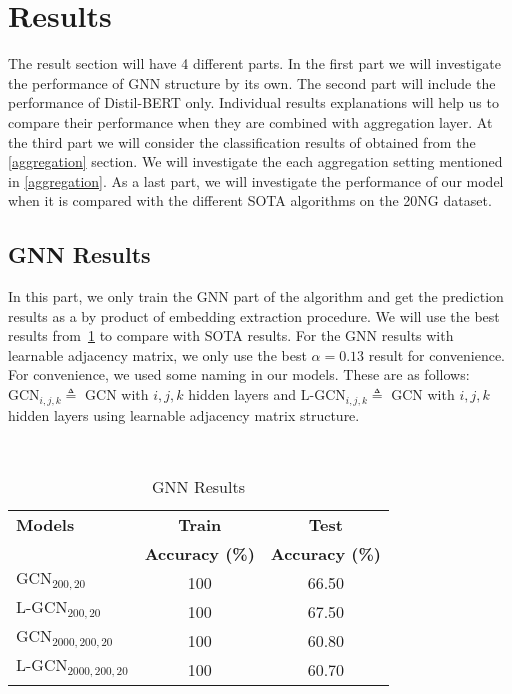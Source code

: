 \section{Results}\label{sec:results}
The result section will have 4 different parts. In the first part we will investigate the performance of GNN structure by its own. The second part will include the performance of Distil-BERT only. Individual results explanations will help us to compare their performance when they are combined with aggregation layer. At the third part we will consider the classification results of obtained \DOCEM{} from the \cref{aggregation} section. We will investigate the each aggregation setting mentioned in \cref{aggregation}. As a last part, we will investigate the performance of our model when it is compared with the different SOTA algorithms on the 20NG dataset.
\subsection{GNN Results}
In this part, we only train the GNN part of the algorithm and get the prediction results as a by product of embedding extraction procedure. We will use the best results from~\cref{tab:results:gnn} to compare with SOTA results. For the GNN results with learnable adjacency matrix, we only use the best $\alpha=0.13$ result for convenience. For convenience, we used some naming in our models. These are as follows: $\text{GCN}_{i,j,k} \triangleq$ GCN with $i,j,k$ hidden layers and $\text{L-GCN}_{i,j,k} \triangleq$ GCN with $i,j,k$ hidden layers using learnable adjacency matrix structure.
\begin{table}[h]
    \centering{}
    \caption{GNN Results}~\label{tab:results:gnn}
    \begin{tabular}{lcc}\toprule
    \textbf{Models}   & \textbf{Train} & \textbf{Test} \\
       & \textbf{Accuracy (\%)} & \textbf{Accuracy (\%)} \\ \midrule
    $\text{GCN}_{200,20}$           & 100        & 66.50        \\
    $\text{L-GCN}_{200,20}$         & 100        & 67.50        \\ 
    $\text{GCN}_{2000,200,20}$      & 100        & 60.80        \\ 
    $\text{L-GCN}_{2000,200,20}$    & 100        & 60.70        \\ 
       \bottomrule
    \end{tabular}
\end{table}

